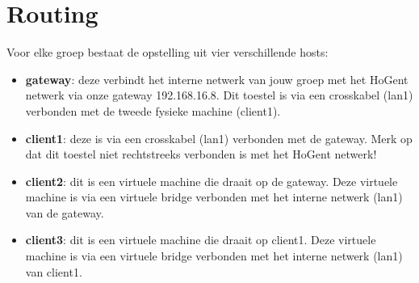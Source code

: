 \documentclass{report}
\begin{document}
\section{Routing}
 Voor elke groep bestaat de opstelling uit vier verschillende hosts:
\begin{itemize}
	\item \textbf{gateway}: deze verbindt het interne netwerk van jouw groep met het HoGent netwerk via onze gateway 192.168.16.8. Dit toestel is via een crosskabel (lan1) verbonden met de tweede fysieke machine (client1).
	\item \textbf{client1}: deze is via een crosskabel (lan1) verbonden met de gateway. Merk op dat dit toestel niet rechtstreeks verbonden is met het HoGent netwerk!
	\item \textbf{client2}: dit is een virtuele machine die draait op de gateway. Deze virtuele machine is via een virtuele bridge verbonden met het interne netwerk (lan1) van de gateway.
	\item \textbf{client3}: dit is een virtuele machine die draait op client1. Deze virtuele machine is via een virtuele bridge verbonden met het interne netwerk (lan1) van client1.
	
\end{itemize}
\end{document}
